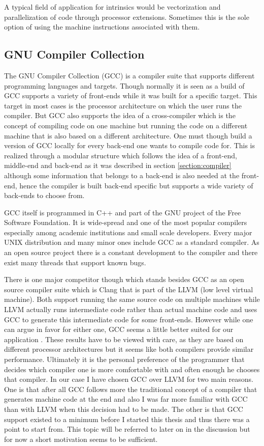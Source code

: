 A typical field of application for intrinsics would be vectorization and parallelization of code through processor extensions.
Sometimes this is the sole option of using the machine instructions associated with them.

\subsection{GNU Compiler Collection}
The GNU Compiler Collection (GCC) is a compiler suite that supports different programming languages and targets.
Though normally it is seen as a build of GCC supports a variety of front-ends while it was built for a specific target.
This target in most cases is the processor architecture on which the user runs the compiler.
But GCC also supports the idea of a cross-compiler which is the concept of compiling code on one machine but running the code on a different machine that is also based on a different architecture.
One must though build a version of GCC locally for every back-end one wants to compile code for.
This is realized through a modular structure which follows the idea of a front-end, middle-end and back-end as it was described in section \ref{section:compiler} although some information that belongs to a back-end is also needed at the front-end, hence the compiler is built back-end specific but supports a wide variety of back-ends to choose from.

GCC itself is programmed in C++ and part of the GNU project of the Free Software Foundation.
It is wide-spread and one of the most popular compilers especially among academic institutions and small scale developers.
Every major UNIX distribution and many minor ones include GCC as a standard compiler.
As an open source project there is a constant development to the compiler and there exist many threads that support known bugs.

There is one major competitor though which stands besides GCC as an open source compiler suite which is Clang that is part of the LLVM (low level virtual machine).
Both support running the same source code on multiple machines while LLVM actually runs intermediate code rather than actual machine code and uses GCC to generate this intermediate code for some front-ends.
However while one can argue in favor for either one, GCC seems a little better suited for our application .
These results have to be viewed with care, as they are based on different processor architectures but it seems like both compilers provide similar performance.
Ultimately it is the personal preference of the programmer that decides which compiler one is more comfortable with and often enough he chooses that compiler.
In our case I have chosen GCC over LLVM for two main reasons.
One is that after all GCC follows more the traditional concept of a compiler that generates machine code at the end and also I was far more familiar with GCC than with LLVM when this decision had to be made.
The other is that GCC support existed to a minimum before I started this thesis and thus there was a point to start from.
This topic will be referred to later on in the discussion but for now a short motivation seems to be sufficient.

